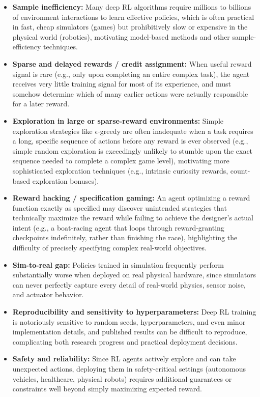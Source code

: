 \documentclass[12pt,a4paper]{article}
\begin{document}
\begin{itemize}[leftmargin=1.5em]
    \item \textbf{Sample inefficiency:} Many deep RL algorithms require millions to billions of environment interactions to learn effective policies, which is often practical in fast, cheap simulators (games) but prohibitively slow or expensive in the physical world (robotics), motivating model-based methods and other sample-efficiency techniques.
    \item \textbf{Sparse and delayed rewards / credit assignment:} When useful reward signal is rare (e.g., only upon completing an entire complex task), the agent receives very little training signal for most of its experience, and must somehow determine which of many earlier actions were actually responsible for a later reward.
    \item \textbf{Exploration in large or sparse-reward environments:} Simple exploration strategies like $\epsilon$-greedy are often inadequate when a task requires a long, specific sequence of actions before any reward is ever observed (e.g., simple random exploration is exceedingly unlikely to stumble upon the exact sequence needed to complete a complex game level), motivating more sophisticated exploration techniques (e.g., intrinsic curiosity rewards, count-based exploration bonuses).
    \item \textbf{Reward hacking / specification gaming:} An agent optimizing a reward function exactly as specified may discover unintended strategies that technically maximize the reward while failing to achieve the designer's actual intent (e.g., a boat-racing agent that loops through reward-granting checkpoints indefinitely, rather than finishing the race), highlighting the difficulty of precisely specifying complex real-world objectives.
    \item \textbf{Sim-to-real gap:} Policies trained in simulation frequently perform substantially worse when deployed on real physical hardware, since simulators can never perfectly capture every detail of real-world physics, sensor noise, and actuator behavior.
    \item \textbf{Reproducibility and sensitivity to hyperparameters:} Deep RL training is notoriously sensitive to random seeds, hyperparameters, and even minor implementation details, and published results can be difficult to reproduce, complicating both research progress and practical deployment decisions.
    \item \textbf{Safety and reliability:} Since RL agents actively explore and can take unexpected actions, deploying them in safety-critical settings (autonomous vehicles, healthcare, physical robots) requires additional guarantees or constraints well beyond simply maximizing expected reward.
\end{itemize}
\end{document}
